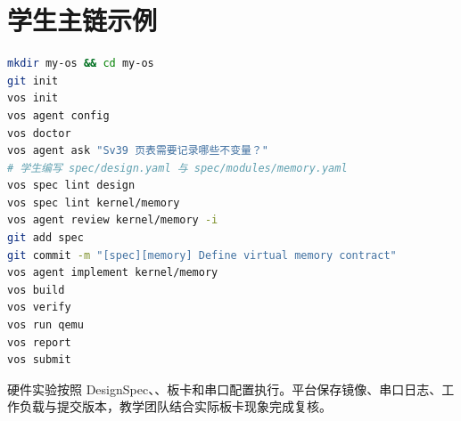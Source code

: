 \section{学生主链示例}

\begin{lstlisting}[language=bash]
mkdir my-os && cd my-os
git init
vos init
vos agent config
vos doctor
vos agent ask "Sv39 页表需要记录哪些不变量？"
# 学生编写 spec/design.yaml 与 spec/modules/memory.yaml
vos spec lint design
vos spec lint kernel/memory
vos agent review kernel/memory -i
git add spec
git commit -m "[spec][memory] Define virtual memory contract"
vos agent implement kernel/memory
vos build
vos verify
vos run qemu
vos report
vos submit
\end{lstlisting}

硬件实验按照 DesignSpec、、板卡和串口配置执行。平台保存镜像、串口日志、工作负载与提交版本，教学团队结合实际板卡现象完成复核。
